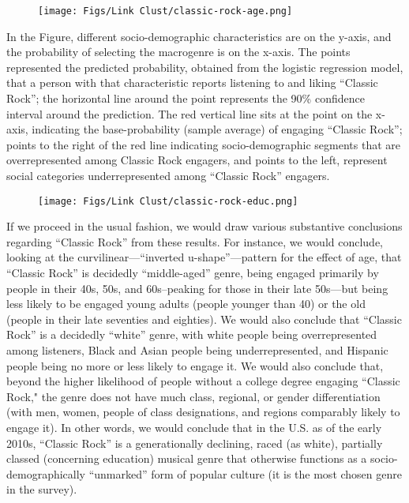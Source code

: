 \begin{figure}[ht!]
    \centering
    \texttt{[image: Figs/Link Clust/classic-rock-age.png]}
    \caption{}
    \label{fig:age}
\end{figure}
 
In the Figure, different socio-demographic characteristics are on the y-axis, and the probability of selecting the macrogenre is on the x-axis. The points represented the predicted probability, obtained from the logistic regression model, that a person with that characteristic reports listening to and liking ``Classic Rock''; the horizontal line around the point represents the 90\% confidence interval around the prediction. The red vertical line sits at the point on the x-axis, indicating the base-probability (sample average) of engaging ``Classic Rock''; points to the right of the red line indicating socio-demographic segments that are overrepresented among Classic Rock engagers, and points to the left, represent social categories underrepresented among ``Classic Rock'' engagers. 

\begin{figure}[ht!]
    \centering
    \texttt{[image: Figs/Link Clust/classic-rock-educ.png]}
    \caption{}
    \label{fig:educ}
\end{figure}

If we proceed in the usual fashion, we would draw various substantive conclusions regarding ``Classic Rock'' from these results. For instance, we would conclude, looking at the curvilinear---``inverted u-shape''---pattern for the effect of age, that ``Classic Rock'' is decidedly ``middle-aged'' genre, being engaged primarily by people in their 40s, 50s, and 60s--peaking for those in their late 50s---but being less likely to be engaged young adults (people younger than 40) or the old (people in their late seventies and eighties). We would also conclude that ``Classic Rock'' is a decidedly ``white'' genre, with white people being overrepresented among listeners, Black and Asian people being underrepresented, and Hispanic people being no more or less likely to engage it. We would also conclude that, beyond the higher likelihood of people without a college degree engaging ``Classic Rock," the genre does not have much class, regional, or gender differentiation (with men, women, people of class designations, and regions comparably likely to engage it). In other words, we would conclude that in the U.S. as of the early 2010s, ``Classic Rock'' is a generationally declining, raced (as white), partially classed (concerning education) musical genre that otherwise functions as a socio-demographically ``unmarked'' form of popular culture (it is the most chosen genre in the survey). 

